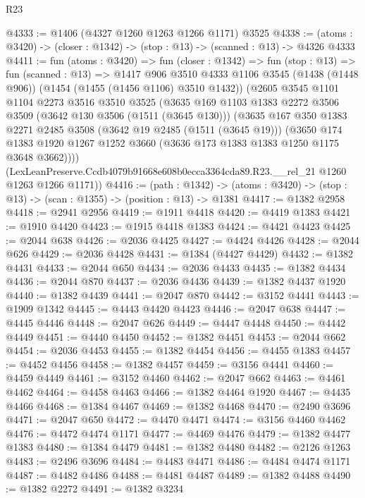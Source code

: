 \begin{lexlean}{R23}
\begin{coremodule}
@4333 := @1406 (@4327 @1260 @1263 @1266 @1171) @3525
@4338 := (atoms : @3420) -> (closer : @1342) -> (stop : @13) -> (scanned : @13) -> @4326 @4333
@4411 := fun (atoms : @3420) =>
  fun (closer : @1342) =>
  fun (stop : @13) =>
  fun (scanned : @13) =>
  @1417
    @906
    @3510
    @4333
    @1106
    @3545
    (@1438 (@1448 @906))
    (@1454 (@1455 (@1456 @1106) @3510 @1432))
    (@2605
      @3545
      @1101
      @1104
      @2273
      @3516
      @3510
      @3525
      (@3635
        @169
        @1103
        @1383
        @2272
        @3506
        @3509
        (@3642 @130 @3506 (@1511 (@3645 @130)))
        (@3635
          @167
          @350
          @1383
          @2271
          @2485
          @3508
          (@3642 @19 @2485 (@1511 (@3645 @19)))
          (@3650
            @174
            @1383
            @1920
            @1267
            @1252
            @3660
            (@3636 @173 @1383 @1383 @1250 @1175 @3648 @3662))))
      (LexLeanPreserve.Ccdb4079b91668e608b0ecca3364cda89.R23.__rel_21 @1260 @1263 @1266 @1171))
@4416 := (path : @1342) ->
  (atoms : @3420) -> (stop : @13) -> (scan : @1355) -> (position : @13) -> @1381
@4417 := @1382 @2958
@4418 := @2941 @2956
@4419 := @1911 @4418
@4420 := @4419 @1383
@4421 := @1910 @4420
@4423 := @1915 @4418 @1383
@4424 := @4421 @4423
@4425 := @2044 @638
@4426 := @2036 @4425
@4427 := @4424 @4426
@4428 := @2044 @626
@4429 := @2036 @4428
@4431 := @1384 (@4427 @4429)
@4432 := @1382 @4431
@4433 := @2044 @650
@4434 := @2036 @4433
@4435 := @1382 @4434
@4436 := @2044 @870
@4437 := @2036 @4436
@4439 := @1382 @4437 @1920
@4440 := @1382 @4439
@4441 := @2047 @870
@4442 := @3152 @4441
@4443 := @1909 @1342
@4445 := @4443 @4420 @4423
@4446 := @2047 @638
@4447 := @4445 @4446
@4448 := @2047 @626
@4449 := @4447 @4448
@4450 := @4442 @4449
@4451 := @4440 @4450
@4452 := @1382 @4451
@4453 := @2044 @662
@4454 := @2036 @4453
@4455 := @1382 @4454
@4456 := @4455 @1383
@4457 := @4452 @4456
@4458 := @1382 @4457
@4459 := @3156 @4441
@4460 := @4459 @4449
@4461 := @3152 @4460
@4462 := @2047 @662
@4463 := @4461 @4462
@4464 := @4458 @4463
@4466 := @1382 @4464 @1920
@4467 := @4435 @4466
@4468 := @1384 @4467
@4469 := @1382 @4468
@4470 := @2490 @3696
@4471 := @2047 @650
@4472 := @4470 @4471
@4474 := @3156 @4460 @4462
@4476 := @4472 @4474 @1171
@4477 := @4469 @4476
@4479 := @1382 @4477 @1383
@4480 := @1384 @4479
@4481 := @1382 @4480
@4482 := @2126 @1263
@4483 := @2496 @3696
@4484 := @4483 @4471
@4486 := @4484 @4474 @1171
@4487 := @4482 @4486
@4488 := @4481 @4487
@4489 := @1382 @4488
@4490 := @1382 @2272
@4491 := @1382 @3234

\end{coremodule}
\end{lexlean}
